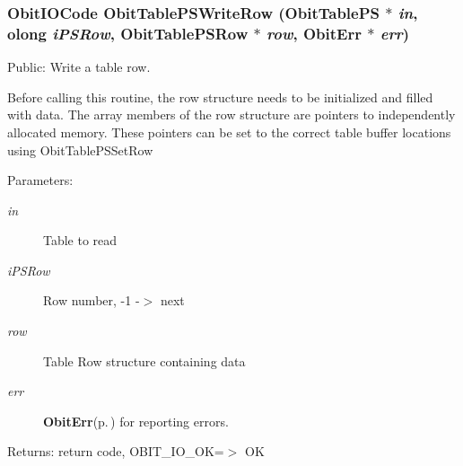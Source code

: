 \subsubsection{\setlength{\rightskip}{0pt plus 5cm}Obit\-IOCode Obit\-Table\-PSWrite\-Row ({\bf Obit\-Table\-PS} $\ast$ {\em in}, {\bf olong} {\em i\-PSRow}, {\bf Obit\-Table\-PSRow} $\ast$ {\em row}, {\bf Obit\-Err} $\ast$ {\em err})}\label{ObitTablePS_8c_a24}


Public: Write a table row. 

Before calling this routine, the row structure needs to be initialized and filled with data. The array members of the row structure are pointers to independently allocated memory. These pointers can be set to the correct table buffer locations using Obit\-Table\-PSSet\-Row \begin{Desc}
\item[Parameters:]
\begin{description}
\item[{\em in}]Table to read \item[{\em i\-PSRow}]Row number, -1 -$>$ next \item[{\em row}]Table Row structure containing data \item[{\em err}]{\bf Obit\-Err}{\rm (p.\,\pageref{structObitErr})} for reporting errors. \end{description}
\end{Desc}
\begin{Desc}
\item[Returns:]return code, OBIT\_\-IO\_\-OK=$>$ OK \end{Desc}
